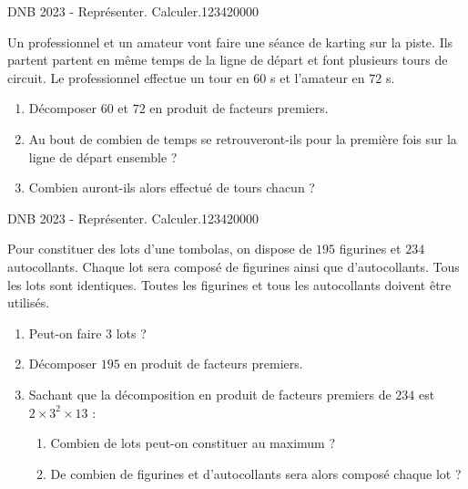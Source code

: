 \begin{pageParcoursd} 
 
\begin{ExoCd}{DNB 2023 - Représenter. Calculer.}{1234}{2}{0}{0}{0}{0}

Un professionnel et un amateur vont faire une séance de karting sur la piste. 
Ils partent partent en même temps de la ligne de départ et font plusieurs tours de circuit.
Le professionnel effectue un tour en $60$ s et l'amateur en $72$ s.

\begin{enumerate}[leftmargin=*]
\item Décomposer $60$ et $72$ en produit de facteurs premiers.
\item Au bout de combien de temps se retrouveront-ils pour la première fois sur la ligne de départ ensemble ?
\item Combien auront-ils alors effectué de tours chacun ?
\end{enumerate}

\end{ExoCd}



\begin{ExoCd}{DNB 2023 - Représenter. Calculer.}{1234}{2}{0}{0}{0}{0}

Pour constituer des lots d'une tombolas, on dispose de $195$ figurines et $234$ autocollants.
Chaque lot sera composé de figurines ainsi que d'autocollants.
Tous les lots sont identiques.
Toutes les figurines et tous les autocollants doivent être utilisés.

\begin{enumerate}[leftmargin=*]
\item Peut-on faire $3$ lots ? 
\item Décomposer $195$ en produit de facteurs premiers. 
\item Sachant que la décomposition en produit de facteurs premiers de $234$ est $2 \times 3^2 \times 13$ :
\begin{enumerate}[leftmargin=*]
\item Combien de lots peut-on constituer au maximum ? 
\item De combien de figurines et d'autocollants sera alors composé chaque lot ? 
\end{enumerate}
\end{enumerate}
\end{ExoCd}



\end{pageParcoursd}
